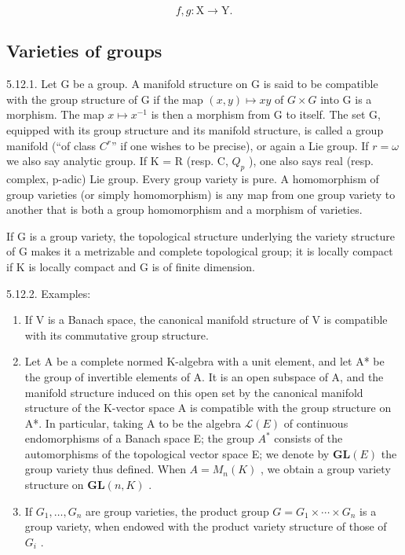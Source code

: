 \[
f, g: \mathrm{X} \longrightarrow \mathrm{Y}.
\]

\subsection{Varieties of groups}

5.12.1. Let G be a group. A manifold structure on G is said to be compatible with the group structure of G if the map \((x, y) \mapsto xy\) of \(G \times G\) into G is a morphism. The map \(x \mapsto x^{-1}\) is then a morphism from G to itself. The set G, equipped with its group structure and its manifold structure, is called a group manifold (“of class \(C^{r}\)” if one wishes to be precise), or again a Lie group. If \(r = \omega\) we also say analytic group. If K = R (resp. C, \(Q_{p}\) ), one also says real (resp. complex, p-adic) Lie group. Every group variety is pure. A homomorphism of group varieties (or simply homomorphism) is any map from one group variety to another that is both a group homomorphism and a morphism of varieties.

If G is a group variety, the topological structure underlying the variety structure of G makes it a metrizable and complete topological group; it is locally compact if K is locally compact and G is of finite dimension.

5.12.2. Examples:

\begin{enumerate}
\def\labelenumi{(\roman{enumi})}
\item
  If V is a Banach space, the canonical manifold structure of V is compatible with its commutative group structure.
\item
  Let A be a complete normed K-algebra with a unit element, and let A* be the group of invertible elements of A. It is an open subspace of A, and the manifold structure induced on this open set by the canonical manifold structure of the K-vector space A is compatible with the group structure on A*. In particular, taking A to be the algebra \(\mathcal{L}(E)\) of continuous endomorphisms of a Banach space E; the group \(A^{*}\) consists of the automorphisms of the topological vector space E; we denote by \(\mathbf{GL}(E)\) the group variety thus defined. When \(A = M_{n}(K)\) , we obtain a group variety structure on \(\mathbf{GL}(n, K)\) .
\item
  If \(G_{1},\ldots,G_{n}\) are group varieties, the product group \(G=G_{1}\times\cdots\times G_{n}\) is a group variety, when endowed with the product variety structure of those of \(G_{i}\) .
\end{enumerate}

